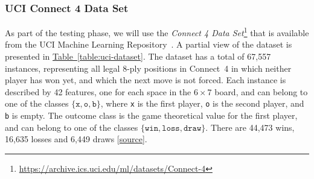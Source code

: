 \documentclass{article}
\newcommand{\GithubURL}[1]{[\href{https://github.com/davidrobles/mlnd-capstone-code/blob/master/#1}{source}]}
\newcommand{\URLUCI}{\url{https://archive.ics.uci.edu/ml/datasets/Connect-4}}
\begin{document}
\subsubsection{UCI Connect 4 Data Set}

As part of the testing phase, we will use the \emph{Connect 4 Data Set}\footnote{\URLUCI{}} that is
available from the UCI Machine Learning Repository~\citep{Hettich1998UCI}. A partial view of the
dataset is presented in \hyperref[table:uci-dataset]{Table~\ref*{table:uci-dataset}}. The dataset
has a total of 67,557 instances, representing all legal 8-ply positions in \mbox{Connect 4} in which
neither player has won yet, and which the next move is not forced. Each instance is described by 42
features, one for each space in the $6 \times 7$ board, and can belong to one of the classes
$\{\texttt{x}, \texttt{o}, \texttt{b}\}$, where \texttt{x} is the first player, \texttt{o} is the
second player, and \texttt{b} is empty. The outcome class is the game theoretical value for the
first player, and can belong to one of the classes $\{\texttt{win}, \texttt{loss}, \texttt{draw}\}$.
There are 44,473 wins, 16,635 losses and 6,449 draws \GithubURL{examples/c4_uci_data_expl.py}.

\end{document}
